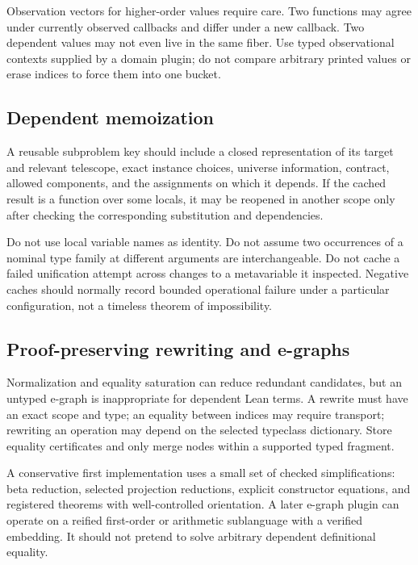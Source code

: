 \documentclass[11pt,letterpaper]{article}
\theoremstyle{definition}
\theoremstyle{remark}
\begin{document}
Observation vectors for higher-order values require care. Two functions may agree under currently observed callbacks and differ under a new callback. Two dependent values may not even live in the same fiber. Use typed observational contexts supplied by a domain plugin; do not compare arbitrary printed values or erase indices to force them into one bucket.

\subsection{Dependent memoization}

A reusable subproblem key should include a closed representation of its target and relevant telescope, exact instance choices, universe information, contract, allowed components, and the assignments on which it depends. If the cached result is a function over some locals, it may be reopened in another scope only after checking the corresponding substitution and dependencies.

Do not use local variable names as identity. Do not assume two occurrences of a nominal type family at different arguments are interchangeable. Do not cache a failed unification attempt across changes to a metavariable it inspected. Negative caches should normally record bounded operational failure under a particular configuration, not a timeless theorem of impossibility.

\subsection{Proof-preserving rewriting and e-graphs}

Normalization and equality saturation can reduce redundant candidates, but an untyped e-graph is inappropriate for dependent Lean terms. A rewrite must have an exact scope and type; an equality between indices may require transport; rewriting an operation may depend on the selected typeclass dictionary. Store equality certificates and only merge nodes within a supported typed fragment.

A conservative first implementation uses a small set of checked simplifications: beta reduction, selected projection reductions, explicit constructor equations, and registered theorems with well-controlled orientation. A later e-graph plugin can operate on a reified first-order or arithmetic sublanguage with a verified embedding. It should not pretend to solve arbitrary dependent definitional equality.
\end{document}
